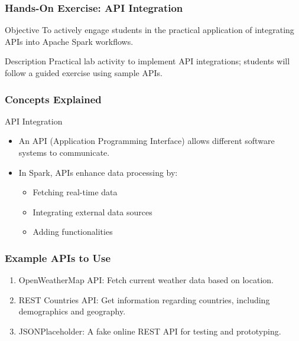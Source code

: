 \documentclass[aspectratio=169]{beamer}
\begin{document}
\begin{frame}
    \frametitle{Hands-On Exercise: API Integration}
    \begin{block}{Objective}
        To actively engage students in the practical application of integrating APIs into Apache Spark workflows.
    \end{block}
    \begin{block}{Description}
        Practical lab activity to implement API integrations; students will follow a guided exercise using sample APIs.
    \end{block}
\end{frame}

\begin{frame}[fragile]
    \frametitle{Concepts Explained}
    \begin{block}{API Integration}
        \begin{itemize}
            \item An API (Application Programming Interface) allows different software systems to communicate.
            \item In Spark, APIs enhance data processing by:
            \begin{itemize}
                \item Fetching real-time data
                \item Integrating external data sources
                \item Adding functionalities
            \end{itemize}
        \end{itemize}
    \end{block}
\end{frame}

\begin{frame}
    \frametitle{Example APIs to Use}
    \begin{enumerate}
        \item OpenWeatherMap API: Fetch current weather data based on location.
        \item REST Countries API: Get information regarding countries, including demographics and geography.
        \item JSONPlaceholder: A fake online REST API for testing and prototyping.
    \end{enumerate}
\end{frame}
\end{document}
